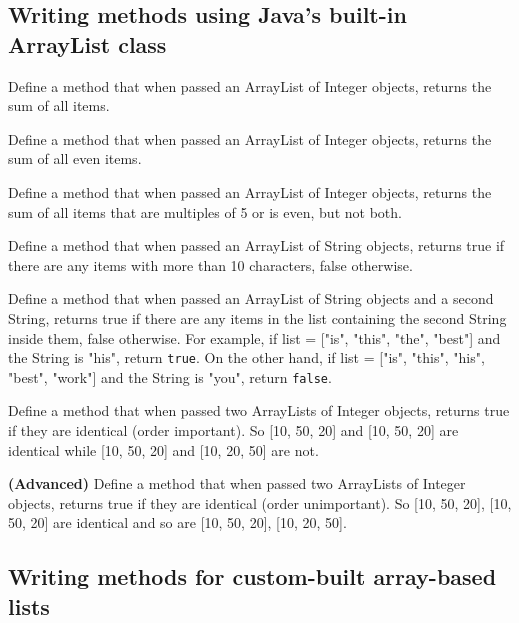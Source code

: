 \subsection*{Writing methods using Java's built-in ArrayList class}
\begin{questions}
\question Define a method that when passed an ArrayList of Integer objects, returns the sum of all items.

\question Define a method that when passed an ArrayList of Integer objects, returns the sum of all even items.

\question Define a method that when passed an ArrayList of Integer objects, returns the sum of all items that are multiples of 5 or is even, but not both.

\question Define a method that when passed an ArrayList of String objects, returns true if there  are any items with more than 10 characters, false otherwise.

\question Define a method that when passed an ArrayList of String objects and a second String, returns true if there  are any items in the list containing the second String inside them, false otherwise. For example, if list = ["is", "this", "the", "best"] and the String is "his", return \texttt{true}. On the other hand, if list = ["is", "this", "his", "best", "work"] and the String is "you", return \texttt{false}.

\question Define a method that when passed two ArrayLists of Integer objects, returns true if they are identical (order important). So [10, 50, 20] and [10, 50, 20] are identical while [10, 50, 20] and [10, 20, 50] are not.

\question \textbf{(Advanced)} Define a method that when passed two ArrayLists of Integer objects, returns true if they are identical (order unimportant). So [10, 50, 20], [10, 50, 20] are identical and so are [10, 50, 20], [10, 20, 50].
\end{questions}

\subsection*{Writing methods for custom-built array-based lists}


